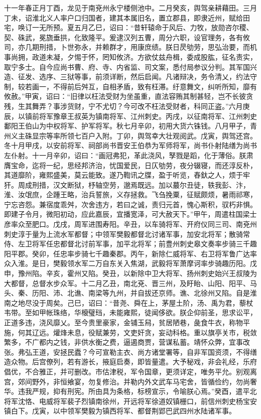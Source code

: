 \documentclass[]{article}
\begin{document}
十一年春正月丁酉，龙见于南兗州永宁楼侧池中。二月癸亥，舆驾亲耕藉田。三月丁未，诏淮北义人率户口归国者，建其本属旧名，置立郡县，即隶近州，赋给田宅，唤订一无所预。夏五月乙巳，诏曰：``昔轩辕命于风后、力牧，放勋咨尔稷、契、硃武，冕旒垂拱，化致隆平。爰逮汉列五曹，周分六职，设官理务，各有攸司，亦几期刑措，卜世弥永，并赖群才，用康庶绩。朕日昃劬劳，思弘治要，而机事尚拥，政道未凝，夕惕于怀，罔知攸济。方欲仗兹舟楫，委成股肱，征名责实，取宁多士。自今应尚书曹、府、寺、内省监、司文案，悉付局参议分判。其军国兴造、征发、选序、三狱等事，前须详断，然后启闻。凡诸辩决，务令清乂，约法守制，较若画一，不得前后舛互，自相矛盾，致有枉滞。纡意舞文，纠听所知，靡有攸赦。''甲寅，诏曰：``旧律以枉法受财为坐虽重，直法容贿其制甚轻，岂不长彼贪残，生其舞弄？事涉货财，宁不尤切？今可改不枉法受财者，科同正盗。''六月庚辰，以镇前将军豫章王叔英为镇南将军、江州刺史。丙戌，以征南将军、江州刺史鄱阳王伯山为中权将军、护军将军。秋七月辛卯，初用大货六铢钱。八月甲子，青州义主硃显宗等率所领七百户入附。丁卯，舆驾幸大壮观阅武。戊寅，舆驾还宫。冬十月甲戌，以安前将军、祠部尚书晋安王伯恭为军师将军，尚书仆射陆缮为尚书左仆射。十一月辛卯，诏曰：``画冠弗犯，革此浇风，孥戮是蹈，化于薄俗。朕肃膺宝命，迄将一纪，思经邦济治，忧国爱民，日仄劬劳，夜分辍寝，而还淳反朴，其道靡阶，雍熙盛美，莫云能致。遂乃鞫讯之牒，盈于听览，舂釱之人，烦于牢犴。周成刑措，汉文断狱，杼轴空劳，邈焉既远。加以蕞尔丑徒，轶我彭、汴，淮、汝氓庶，企踵王略，治兵誓旅，义存拯救。飞刍挽粟，征赋颇烦，暑雨祁寒，宁忘咨怨。兼宿度乖舛，次舍违方，若曰之诚，责归元首，愧心斯积，驭朽非惧。即建子令月，微阳初动，应此嘉辰，宜播宽泽，可大赦天下。''甲午，周遣柱国梁士彦率众至肥口。戊戌，周军进围寿阳。辛丑，以车骑将军、开府仪同三司、南兗州刺史淳于量为上流水军都督；中领军樊毅都督北讨诸军事，加安北将军；散骑常侍、左卫将军任忠都督北讨前军事，加平北将军；前豊州刺史皋文奏率步骑三千趣阳平郡。癸卯，任忠率步骑七千趣秦郡。丙午，新除仁威将军、右卫将军鲁广达率众入淮。是日，樊毅领水军二万自东关入焦湖，武毅将军萧摩诃率步骑趣历阳。戊申，豫州陷。辛亥，霍州又陷。癸丑，以新除中卫大将军、扬州刺史始兴王叔陵为大都督，总督水步众军。十二月乙丑，南北兗、晋三州，及盱眙、山阳、阳平、马头、秦、历阳、沛、北谯、南梁等九州，并自拔还京师。谯、北徐州又陷。自是淮南之地尽没于周矣。己巳，诏曰：``昔尧、舜在上，茅屋土阶，汤、禹为君，藜杖韦带。至如甲帐珠络，华榱璧珰，未能雍熙，徒闻侈欲。朕企仰前圣，思求讼平，正道多违，浇风靡乂。至今贵里豪家，金铺玉舄，贫居陋巷，彘食牛衣，称物平施，何其辽远。爟烽未息，役赋兼劳，文吏奸贪，妄动科格。重以旗亭关市，税敛繁多，不广都内之钱，非供水衡之费，逼遏商贾，营谋私蓄。靖怀众弊，宜事改张。弗弘王道，安拯民蠹？今可宣勒主衣、尚方诸堂署等，自非军国资须，不得缮造众物。后宫僚列，若有游长，掖庭启奏，即皆量遣。大予秘戏，非会礼经，乐府倡优，不合雅正，并可删改。市估津税，军令国章，更须详定，唯务平允。别观离宫，郊间野外，非恒飨宴，勿复修治。并勒内外文武车马宅舍，皆循俭约，勿尚奢华。违我严规，抑有刑宪。所由具为条格，标榜宣示，令喻朕心焉。''癸酉，遣平北将军沈恪、电威将军裴子烈镇南徐州，开远将军徐道奴镇栅口，前信州刺史杨宝安镇白下。戊寅，以中领军樊毅为镇西将军、都督荆郢巴武四州水陆诸军事。
\end{document}
